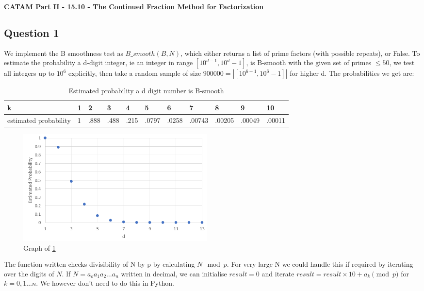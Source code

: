 \documentclass[10pt,a4paper]{report}
\begin{document}
\textbf{CATAM Part II - 15.10 - The Continued Fraction Method for
Factorization}


\subsection*{Question 1}
We implement the B smoothness test as $B\_smooth(B,N)$, which either returns a list of prime factors (with possible repeats), or False. To estimate the probability a d-digit integer, ie an integer in range $[10^{d-1},10^d-1]$, is B-smooth with the given set of primes $\leq 50$, we test all integers up to $10^6$ explicitly, then take a random sample of size $900000 = | [10^{6-1},10^6-1] |$ for higher d. The probabilities we get are:

\begin{table}[h]
\centering
\begin{tabular}{|l|l|l|l|l|l|l|l|l|l|l|}
\hline
k                     & 1 & 2    & 3    & 4    & 5     & 6     & 7      & 8      & 9      & 10     \\ \hline
estimated probability & 1 & .888 & .488 & .215 & .0797 & .0258 & .00743 & .00205 & .00049 & .00011 \\ \hline
\end{tabular}
\caption{Estimated probability a d digit number is B-smooth}
\label{tab:my-table}
\end{table}

\begin{figure}[h]
\centering
\includegraphics[width=10cm]{q1graph.png}
\caption{Graph of \ref{tab:my-table}}
\end{figure}

The function written checks divisibility of N by p by calculating $N \mod p$. For very large N we could handle this if required by iterating over the digits of $N$. If $N=a_oa_1a_2\dots a_n$ written in decimal, we can initialise $result=0$ and iterate $result=result\times10+a_k\pmod p$ for $k=0,1\dots n$.	We however don't need to do this in Python.
\end{document}
